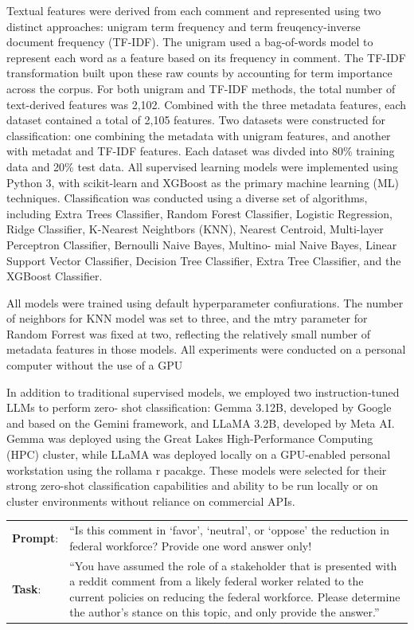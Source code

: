 \documentclass[
  12pt]{article}
\begin{document}
Textual features were derived from each comment and represented using
two distinct approaches: unigram term frequency and term
freuqency-inverse document frequency (TF-IDF). The unigram used a
bag-of-words model to represent each word as a feature based on its
frequency in comment. The TF-IDF transformation built upon these raw
counts by accounting for term importance across the corpus. For both
unigram and TF-IDF methods, the total number of text-derived features
was 2,102. Combined with the three metadata features, each dataset
contained a total of 2,105 features. Two datasets were constructed for
classification: one combining the metadata with unigram features, and
another with metadat and TF-IDF features. Each dataset was divded into
80\% training data and 20\% test data. All supervised learning models
were implemented using Python 3, with scikit-learn and XGBoost as the
primary machine learning (ML) techniques. Classification was conducted
using a diverse set of algorithms, including Extra Trees Classifier,
Random Forest Classifier, Logistic Regression, Ridge Classifier,
K-Nearest Neightbors (KNN), Nearest Centroid, Multi-layer Perceptron
Classifier, Bernoulli Naive Bayes, Multino- mial Naive Bayes, Linear
Support Vector Classifier, Decision Tree Classifier, Extra Tree
Classifier, and the XGBoost Classifier.

All models were trained using default hyperparameter confiurations. The
number of neighbors for KNN model was set to three, and the mtry
parameter for Random Forrest was fixed at two, reflecting the relatively
small number of metadata features in those models. All experiments were
conducted on a personal computer without the use of a GPU

In addition to traditional supervised models, we employed two
instruction-tuned LLMs to perform zero- shot classification: Gemma
3.12B, developed by Google and based on the Gemini framework, and LLaMA
3.2B, developed by Meta AI. Gemma was deployed using the Great Lakes
High-Performance Computing (HPC) cluster, while LLaMA was deployed
locally on a GPU-enabled personal workstation using the rollama r
pacakge. These models were selected for their strong zero-shot
classification capabilities and ability to be run locally or on cluster
environments without reliance on commercial APIs.

\begin{longtable}[]{@{}
  >{\raggedright\arraybackslash}p{}
  >{\raggedright\arraybackslash}p{}@{}}
\toprule\noalign{}
\endhead
\bottomrule\noalign{}
\endlastfoot
\textbf{Prompt}: & ``Is this comment in `favor', `neutral', or `oppose'
the reduction in federal workforce? Provide one word answer only! \\
\textbf{Task}: & ``You have assumed the role of a stakeholder that is
presented with a reddit comment from a likely federal worker related to
the current policies on reducing the federal workforce. Please determine
the author's stance on this topic, and only provide the answer.'' \\
\end{longtable}
\end{document}
